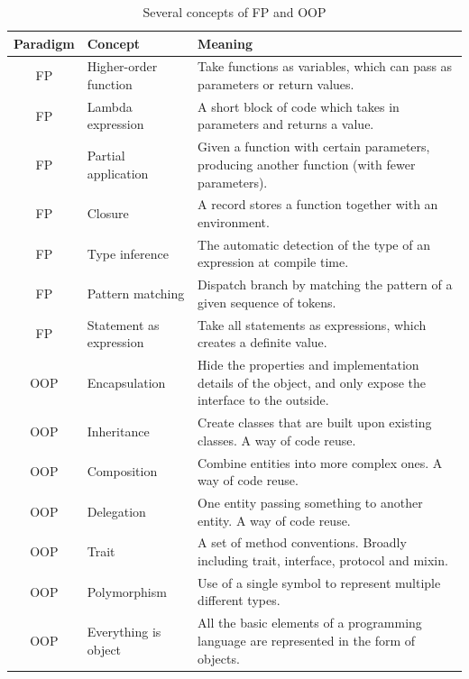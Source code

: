 \begin{table}[hb]
    \caption{Several concepts of FP and OOP}
    \label{tab:concept}
    \begin{center}
        \begin{tabular}{cll}
            \toprule
            Paradigm & Concept & Meaning \\
            \midrule
            FP & Higher-order function & Take functions as variables, which can
            pass as parameters or return values. \\
            FP & Lambda expression & A short block of code which takes in parameters
            and returns a value. \\
            FP & Partial application & Given a function with certain parameters,
            producing another function (with fewer parameters). \\
            FP & Closure & A record stores a function together with an
            environment\cite{sussman1998scheme}. \\
            FP & Type inference & The automatic detection of the type of an
            expression at compile time. \\
            FP & Pattern matching & Dispatch branch by matching the pattern of a
            given sequence of tokens. \\
            FP & Statement as expression & Take all statements as expressions, which
            creates a definite value. \\
            OOP & Encapsulation & Hide the properties and implementation details of
            the object, and only expose the interface to the outside. \\
            OOP & Inheritance & Create classes that are built upon existing
            classes\cite{johnson1988designing}. A way of
            code reuse. \\
            OOP & Composition & Combine entities into more complex ones. A way of
            code reuse. \\
            OOP & Delegation & One entity passing something to another
            entity\cite{wilkinson2009grid}. A way of code
            reuse. \\
            OOP & Trait & A set of method conventions. Broadly including trait,
            interface, protocol and mixin. \\
            OOP & Polymorphism & Use of a single symbol to represent multiple
            different
            types\cite{cardelli1985understanding}. \\
            OOP & Everything is object & All the basic elements of a programming
            language are represented in the form of objects. \\
            \bottomrule
        \end{tabular}
    \end{center}
\end{table}

